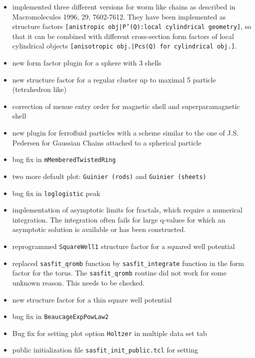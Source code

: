 \begin{description}
        \begin{itemize}
        \item implemented three different versions for worm like chains as
              described in Macromolecules 1996, 29, 7602-7612. They have
              been implemented as structure factors
              \texttt{[anistropic obj|P'(Q):local cylindrical geometry]},
              so that it can be combined with different cross-section
              form factors of local cylindrical objects
              \texttt{[anisotropic obj.|Pcs(Q) for cylindrical obj.]}.
        \item new form factor plugin for a sphere with 3 shells
        \item new structure factor for a regular cluster up to maximal 5 particle
              (tetrahedron like)
        \item correction of menue entry order for magnetic shell and
              superparamagnetic shell
        \item new plugin for ferrofluid particles with a scheme similar to
              the one of J.S. Pedersen for Gaussian Chains attached to a spherical particle
        \item bug fix in \texttt{mMemberedTwistedRing}
        \item two more default plot: \texttt{Guinier (rods)} and \texttt{Guinier (sheets)}
        \item bug fix in \texttt{loglogistic} peak
        \item implementation of asymptotic limits for fractals, which require a
              numerical integration. The integration often fails for large q-values
              for which an asymptotic solution is available or has been constructed.
        \item reprogrammed \texttt{SquareWell1} structure factor for a squared well potential
        \item replaced \texttt{sasfit\_qromb} function by \texttt{sasfit\_integrate} function in the
              form factor for the torus. The \texttt{sasfit\_qromb} routine did not work for some
              unknown reason. This needs to be checked.
        \item new structure factor for a thin square well potential
        \item bug fix in \texttt{BeaucageExpPowLaw2}
        \item Bug fix for setting plot option
              \texttt{Holtzer} in multiple data set tab
        \item public initialization file \texttt{sasfit\_init\_public.tcl} for setting

\end{itemize}
\end{description}

